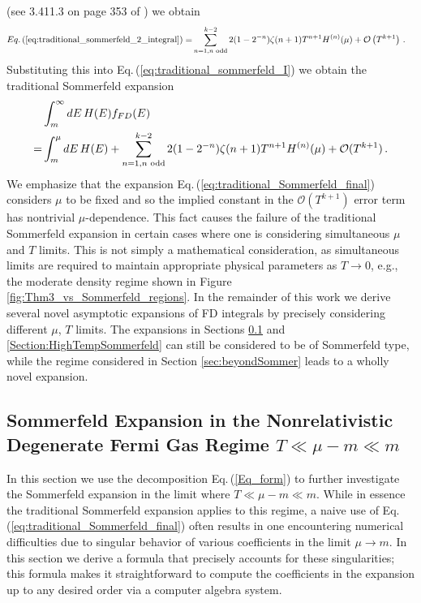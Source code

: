 \documentclass[sn-mathphys,Numbered]{sn-jnl}
\newcommand{\req}[1]{Eq.\,(\ref{#1})}
\begin{document}
(see 3.411.3 on page 353 of \cite{Gradshteyn:1943cpj}) we obtain 
\begin{align}
 \req{eq:traditional_sommerfeld_2_integral} 
 =&\sum_{n=1,n\text{ odd}}^{k-2} 2(1-2^{-n})\zeta(n+1)T^{n+1} H^{(n)}(\mu) +\mathcal{O}\left(T^{k+1}\right)\,.
\end{align}
Substituting this into \req{eq:traditional_sommerfeld_I} we obtain the traditional Sommerfeld expansion
\begin{align}
 &\int_m^\infty dE\, H(E) f_{FD}(E)\notag\\
 = &\int_m^\mu dE\, H(E)+\sum_{n=1,n\text{ odd}}^{k-2} 2(1-2^{-n})\zeta(n+1)T^{n+1} H^{(n)}(\mu) +\mathcal{O}(T^{k+1})\,.\label{eq:traditional_Sommerfeld_final}
 \end{align}
 We emphasize that the expansion \req{eq:traditional_Sommerfeld_final} considers $\mu$ to be fixed and so the implied constant in the $\mathcal{O}(T^{k+1})$ error term has nontrivial $\mu$-dependence. This fact causes the failure of the traditional Sommerfeld expansion in certain cases where one is considering simultaneous $\mu$ and $T$ limits. This is not simply a mathematical consideration, as simultaneous limits are required to maintain appropriate physical parameters as $T\to 0$, e.g., the moderate density regime shown in Figure \ref{fig:Thm3_vs_Sommerfeld_regions}. In the remainder of this work we derive several novel asymptotic expansions of FD integrals by precisely considering different $\mu$, $T$ limits. The expansions in Sections \ref{sec:asymp_T_0_faster} and \ref{Section:HighTempSommerfeld} can still be considered to be of Sommerfeld type, while the regime considered in Section \ref{sec:beyondSommer} leads to a wholly novel expansion.




\subsection{Sommerfeld Expansion in the Nonrelativistic Degenerate Fermi Gas Regime $T\ll \mu-m\ll m$}\label{sec:asymp_T_0_faster}
In this section we use the decomposition \req{Eq_form} to further investigate the Sommerfeld expansion in the limit where $T\ll\mu-m\ll m$. While in essence the traditional Sommerfeld expansion applies to this regime, a naive use of \req{eq:traditional_Sommerfeld_final} often results in one encountering numerical difficulties due to singular behavior of various coefficients in the limit $\mu\to m$. In this section we derive a formula that precisely accounts for these singularities; this formula makes it straightforward to compute the coefficients in the expansion up to any desired order via a computer algebra system.
\end{document}
